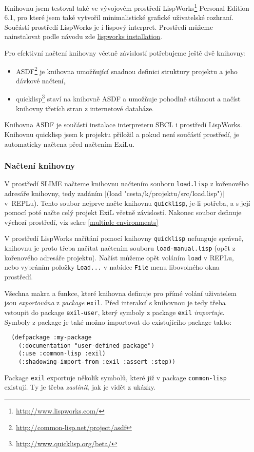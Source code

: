 Knihovnu jsem testoval také ve vývojovém prostředí
LispWorks\registered\footnote{\url{http://www.lispworks.com/}} Personal Edition 6.1,
pro které jsem také vytvořil minimalistické grafické uživatelské rozhraní.
Součástí prostředí LispWorks je i lispový interpret. Prostředí můžeme nainstalovat
podle návodu zde \url{lispworks installation}.

Pro efektivní načtení knihovny včetně závislostí potřebujeme ještě dvě knihovny:
\begin{itemize}
  \item ASDF\footnote{\url{http://common-lisp.net/project/asdf}} je knihovna
    umožňující snadnou definici struktury projektu a jeho dávkové načtení,
  \item quicklisp\footnote{\url{http://www.quicklisp.org/beta/}} staví na knihovně
    ASDF a umožňuje pohodlně stáhnout a načíst knihovny třetích stran z internetové
    databáze.
\end{itemize}
Knihovna ASDF je součástí instalace interpreteru SBCL i prostředí LispWorks.
Knihovnu quicklisp jsem k projektu přiložil a pokud není součástí prostředí, je
automaticky načtena před načtením ExiLu.
\subsubsection{Načtení knihovny}
V prostředí SLIME načteme knihovnu načtením souboru \verb|load.lisp| z kořenového
adresáře knihovny, tedy zadáním \cl|(load "cesta/k/projektu/src/load.lisp")|
v~REPLu). Tento soubor nejprve načte knihovnu \verb|quicklisp|, je-li potřeba,
a s její pomocí poté načte celý projekt ExiL včetně závislostí. Nakonec soubor
definuje výchozí prostředí, viz sekce \ref{multiple environments}

V prostředí LispWorks načítání pomocí knihovny \verb|quicklisp| nefunguje správně,
knihovnu je proto třeba načítat načtením souboru \verb|load-manual.lisp| (opět
z kořenového adresáře projektu). Načíst můžeme opět voláním \verb|load| v REPLu,
nebo vybráním položky \verb|Load...| v nabídce \verb|File| menu libovolného okna
prostředí.

Všechna makra a funkce, které knihovna definuje pro přímé volání uživatelem jsou
\emph{exportována} z \emph{package} \verb|exil|. Před interakcí s knihovnou je
tedy třeba vstoupit do package \verb|exil-user|, který symboly z package
\verb|exil| \emph{importuje}. Symboly z package je také možno importovat do
existujícího package takto:
\begin{verbatim}
  (defpackage :my-package
    (:documentation "user-defined package")
    (:use :common-lisp :exil)
    (:shadowing-import-from :exil :assert :step))
\end{verbatim}
Package \verb|exil| exportuje několik symbolů, které již v package
\verb|common-lisp| existují. Ty je třeba \emph{zastínit}, jak je vidět z ukázky.
